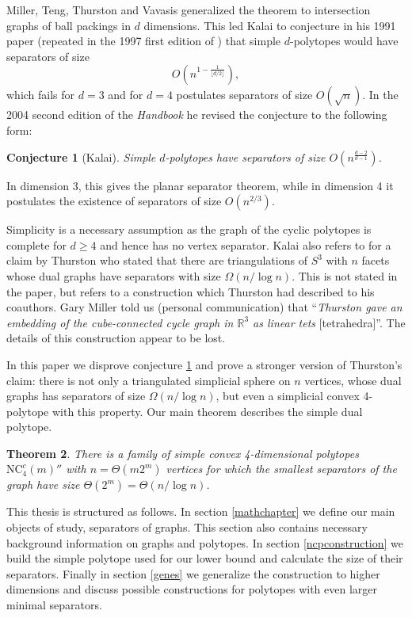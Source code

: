 \documentclass[a4paper,12pt]{book}
\theoremstyle{plain}
\newtheorem{theorem}{Theorem}[section]
\newtheorem{conjecture}[theorem]{Conjecture}
\theoremstyle{definition}
\newcommand\NCC{\mathrm{NC}^c}
\begin{document}
Miller, Teng, Thurston and Vavasis \cite{MillerTengThurstonVavasis} generalized 
the theorem to intersection graphs of ball packings in $d$ dimensions. This 
led Kalai to conjecture in his 1991 paper \cite[Conj 12.1.]{Ka2}(repeated in the 1997 first edition of \cite{Kal97} ) that 
simple $d$-polytopes would have separators of size
\begin{equation}
O\left(n^{1-\frac{1}{\lfloor d/2 \rfloor}}\right),
\end{equation}
which fails for $d=3$ and for $d=4$ postulates separators of size $O(\sqrt{n})$. In the 2004 second edition of
the \textit{Handbook} \cite[Conj. 20.2.12]{kalai04:_polyt} he revised the conjecture to the following form:
\begin{conjecture}[Kalai]
\label{simpleconjecture}
Simple $d$-polytopes have separators of size
$O \left(n^{\frac{d-2}{d-1}}\right)$.
\end{conjecture}
In dimension 3, this gives the planar separator theorem, while in dimension 4 it postulates the existence
of separators of size $O(n^{2/3}).$

Simplicity is a necessary assumption as the graph of the cyclic polytopes is complete for 
$d\geq 4$ and hence has no vertex separator. Kalai also refers to 
\cite{MillerTengThurstonVavasis} for a claim by Thurston who stated that there are triangulations of 
$S^3$ with $n$ facets whose dual graphs have separators with size $\Omega(n/\log n)$. This is not 
stated in the paper, but refers to a construction which Thurston had described to his 
coauthors. Gary Miller told us (personal communication) that 
“\textit{Thurston gave an embedding of the cube-connected cycle graph in $\mathbb{R}^3$
as linear tets} [tetrahedra]”. The details of this construction appear to be lost.

In this paper we disprove conjecture \ref{simpleconjecture} and prove a stronger version of Thurston's claim: there is not only a triangulated simplicial sphere
on $n$ vertices, whose dual graphs has separators of size $\Omega(n/\log n)$, but even a simplicial convex 4-polytope
with this property. Our main theorem describes the simple dual polytope.

\begin{theorem}
There is a family of simple convex 4-dimensional polytopes $\NCC_4(m)''$ with $n=\Theta(m 2^m)$ vertices for which
the smallest separators of the graph have size $\Theta(2^m) = \Theta(n/\log n)$.
\end{theorem}

This thesis is structured as follows. In section \ref{mathchapter} we define our main objects of study,
separators of graphs. This section also contains necessary background information on 
graphs and polytopes. In section \ref{ncpconstruction} we build the simple polytope used for our 
lower bound and calculate the size of their separators. Finally in section \ref{genes} we generalize
the construction to higher dimensions and discuss possible constructions for polytopes with even larger
minimal separators.
\end{document}
